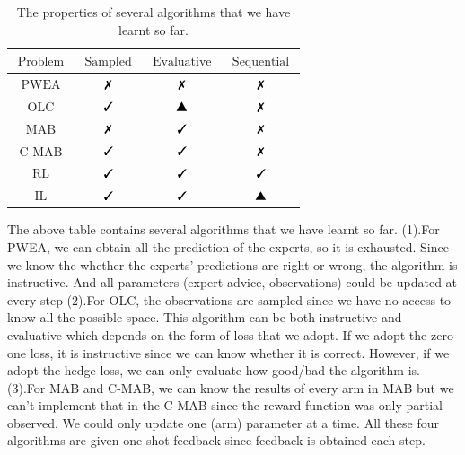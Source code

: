 \documentclass[11pt]{article}
\newcommand{\xmark}{\text{\ding{55}}}
\newcommand{\cmark}{\text{\ding{51}}}
\newcommand{\tri}{\text{\ding{115}}}
\begin{document}
\begin{table}[h!]
    \centering
    \begin{tabular}{|c|c|c|c|}
        \hline $\text { Problem }$ &  $\text { Sampled }$ & $\text { Evaluative }$ & $\text { Sequential }$ \\
        \hline $\text { PWEA }$ &     $\xmark$ & $\xmark$ & $\xmark$ \\
        \hline $\text { OLC }$ &      $\cmark$ & $\tri$ & $\xmark$ \\
        \hline $\text { MAB }$ &      $\xmark$ &        $\cmark$ & $\xmark$ \\
        \hline $\text { C-MAB }$ &    $\cmark$ & $\cmark$ & $\xmark$ \\
        \hline $\text { RL }$ &      $\cmark$ & $\cmark$ & $\cmark$ \\
        \hline $\text { IL }$ &      $\cmark$ & $\cmark$ & $\tri$ \\
        \hline
    \end{tabular}
    \caption{The properties of several algorithms that we have learnt so far.}
    \label{tab:my_label}
\end{table}

The above table contains several algorithms that we have learnt so far. (1).For PWEA, we can obtain all the prediction of the experts, so it is exhausted. Since we know the whether the experts' predictions are right or wrong, the algorithm is instructive. And all parameters (expert advice, observations) could be updated at every step (2).For OLC, the observations are sampled since we have no access to know all the possible space. This algorithm can be both instructive and evaluative which depends on the form of loss that we adopt. If we adopt the zero-one loss, it is instructive since we can know whether it is correct. However, if we adopt the hedge loss, we can only evaluate how good/bad the algorithm is. (3).For MAB and C-MAB, we can know the results of every arm in MAB but we can't implement that in the C-MAB since the reward function was only partial observed.
We could only update one (arm) parameter at a time. All these four algorithms are given one-shot feedback since feedback is obtained each step.


\end{document}
